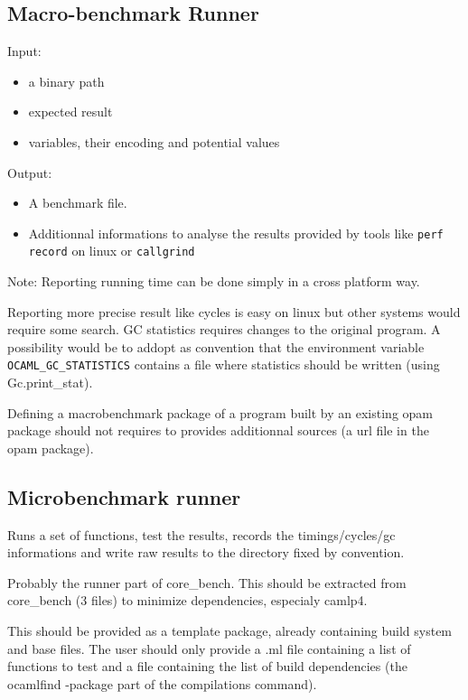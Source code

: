 \documentclass[11pt,a4paper]{article}
\begin{document}
\subsection{Macro-benchmark Runner}

Input:
\begin{itemize}
\item a binary path
\item expected result
\item variables, their encoding and potential values
\end{itemize}

Output:
\begin{itemize}
\item A benchmark file.
\item Additionnal informations to analyse the results provided by
  tools like \texttt{perf record} on linux or \texttt{callgrind}
\end{itemize}

Note: Reporting running time can be done simply in a cross platform
way.

Reporting more precise result like cycles is easy on linux but
other systems would require some search. GC statistics requires
changes to the original program. A possibility would be to addopt as
convention that the environment variable
\texttt{OCAML\_GC\_STATISTICS} contains a file where statistics should
be written (using Gc.print\_stat).

Defining a macrobenchmark package of a program built by an existing
opam package should not requires to provides additionnal sources (a
url file in the opam package).

\subsection{Microbenchmark runner}

Runs a set of functions, test the results, records the
timings/cycles/gc informations and write raw results to the directory
fixed by convention.

Probably the runner part of core\_bench. This should be extracted from
core\_bench (3 files) to minimize dependencies, especialy camlp4.

This should be provided as a template package, already containing
build system and base files. The user should only provide a .ml file
containing a list of functions to test and a file containing the list
of build dependencies (the ocamlfind -package part of the compilations
command).
\end{document}
